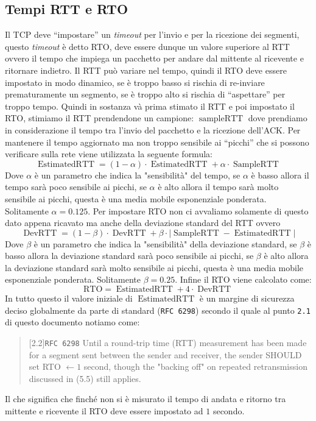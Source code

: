     \subsection[Tempi \texttt{RTT} e \texttt{RTO}]{Tempi \Acrshort*{RTT} e \Acrshort*{RTO}}
        Il \Acrshort*{TCP} deve ``impostare'' un \textit{timeout} per l'invio e per la ricezione dei segmenti, questo \textit{timeout} è detto \acrfull*{RTO}, deve essere dunque un valore superiore al \acrfull*{RTT} ovvero il tempo che impiega un pacchetto per andare dal mittente al ricevente e ritornare indietro. Il \Acrshort*{RTT} può variare nel tempo, quindi il \Acrshort*{RTO} deve essere impostato in modo dinamico, se è troppo basso si rischia di re-inviare prematuramente un segmento, se è troppo alto si rischia di ``aspettare'' per troppo tempo. Quindi in sostanza và prima stimato il \Acrshort*{RTT} e poi impostato il \Acrshort*{RTO}, stimiamo il \Acrshort*{RTT} prendendone un campione: $\operatorname{sampleRTT}$ dove prendiamo in considerazione il tempo tra l'invio del pacchetto e la ricezione dell'\Acrshort*{ACK}. Per mantenere il tempo aggiornato ma non troppo sensibile ai ``picchi'' che si possono verificare sulla rete viene utilizzata la seguente formula:
        \[ \operatorname{EstimatedRTT} = (1-\alpha) \cdot \operatorname{EstimatedRTT} + \alpha \cdot \operatorname{SampleRTT} \]
        Dove $ \alpha $ è un parametro che indica la "sensibilità" del tempo, se $ \alpha $ è basso allora il tempo sarà poco sensibile ai picchi, se $ \alpha $ è alto allora il tempo sarà molto sensibile ai picchi, questa è una media mobile esponenziale ponderata. Solitamente $ \alpha = 0.125 $.\newline
        Per impostare \Acrshort*{RTO} non ci avvaliamo solamente di questo dato appena ricavato ma anche della deviazione standard del \Acrshort*{RTT} ovvero 
        $$ \operatorname{DevRTT} = (1-\beta) \cdot \operatorname{DevRTT} + \beta \cdot \left| \operatorname{SampleRTT} - \operatorname{EstimatedRTT} \right| $$
        Dove $ \beta $ è un parametro che indica la "sensibilità" della deviazione standard, se $ \beta $ è basso allora la deviazione standard sarà poco sensibile ai picchi, se $ \beta $ è alto allora la deviazione standard sarà molto sensibile ai picchi, questa è una media mobile esponenziale ponderata. Solitamente $ \beta = 0.25 $.\newline
        Infine il \Acrshort*{RTO} viene calcolato come: 
        $$ \text{RTO} = \operatorname{EstimatedRTT} + 4 \cdot \operatorname{DevRTT} $$
        In tutto questo il valore iniziale di $\operatorname{EstimatedRTT}$ è un margine di sicurezza deciso globalmente da parte di standard (\texttt{\Acrshort*{RFC} 6298}) secondo il quale al punto \texttt{2.1} di questo documento notiamo come: 
        \begin{quote}[2.2]{\texttt{\Acrshort*{RFC} 6298}}
            Until a round-trip time (RTT) measurement has been made for a segment sent between the sender and receiver, the sender SHOULD set RTO $\leftarrow 1$ second, though the "backing off" on repeated retransmission discussed in (5.5) still applies.
        \end{quote}
        Il che significa che finché non si è misurato il tempo di andata e ritorno tra mittente e ricevente il \Acrshort*{RTO} deve essere impostato ad $1$ secondo.
